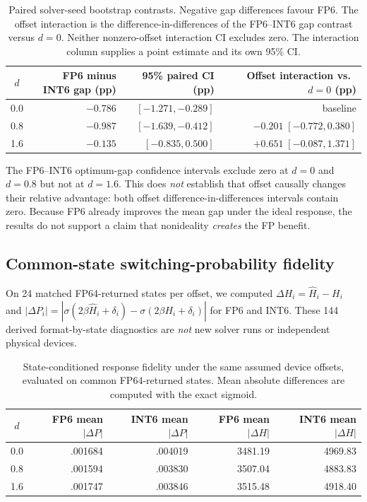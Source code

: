\begin{table}[htbp]\centering\small
\begin{tabular}{@{}c rrr@{}}\toprule
$d$ & FP6 minus INT6 gap (pp) & 95\% paired CI (pp)
 & Offset interaction vs.\ $d=0$ (pp)\\\midrule
0.0 & $-0.786$ & $[-1.271,-0.289]$ & baseline\\
0.8 & $-0.987$ & $[-1.639,-0.412]$ &
 $-0.201\;[-0.772,0.380]$\\
1.6 & $-0.135$ & $[-0.835,0.500]$ &
 $+0.651\;[-0.087,1.371]$\\\bottomrule
\end{tabular}
\caption{Paired solver-seed bootstrap contrasts. Negative gap
differences favour FP6. The offset interaction is the
difference-in-differences of the FP6--INT6 gap contrast versus
$d=0$. Neither nonzero-offset interaction CI excludes zero.
The interaction column supplies a point estimate and its own 95\% CI.}
\label{tab:m5-paired-gap}
\end{table}

The FP6--INT6 optimum-gap confidence intervals exclude zero at
$d=0$ and $d=0.8$ but not at $d=1.6$. This does \emph{not}
establish that offset causally changes their relative advantage:
both offset difference-in-differences intervals contain zero.
Because FP6 already improves the mean gap under the ideal response,
the results do not support a claim that nonideality \emph{creates}
the FP benefit.

\subsection{Common-state switching-probability fidelity}
On 24 matched FP64-returned states per offset, we computed
$\Delta H_i=\widehat H_i-H_i$ and
$|\Delta P_i|=
|\sigma(2\beta\widehat H_i+\delta_i)
-\sigma(2\beta H_i+\delta_i)|$
for FP6 and INT6. These 144 derived format-by-state diagnostics
are \emph{not} new solver runs or independent physical devices.

\begin{table}[htbp]\centering\small
\begin{tabular}{@{}c rrrr@{}}\toprule
$d$ & FP6 mean $|\Delta P|$ & INT6 mean $|\Delta P|$
 & FP6 mean $|\Delta H|$ & INT6 mean $|\Delta H|$\\\midrule
0.0 & .001684 & .004019 & 3481.19 & 4969.83\\
0.8 & .001594 & .003830 & 3507.04 & 4883.83\\
1.6 & .001747 & .003846 & 3515.48 & 4918.40\\\bottomrule
\end{tabular}
\caption{State-conditioned response fidelity under the same assumed
device offsets, evaluated on common FP64-returned states. Mean
absolute differences are computed with the exact sigmoid.}
\label{tab:m5-fidelity}
\end{table}

